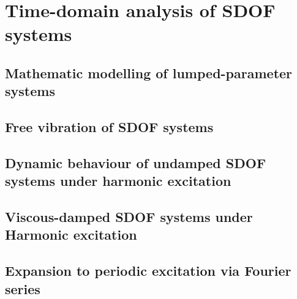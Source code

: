 \chapter[]{Time-domain analysis of SDOF systems}

\section{Mathematic modelling of lumped-parameter systems}

\section{Free vibration of SDOF systems}

\section{Dynamic behaviour of undamped SDOF systems under harmonic excitation}

\section{Viscous-damped SDOF systems under Harmonic excitation}

\section{Expansion to periodic excitation via Fourier series}